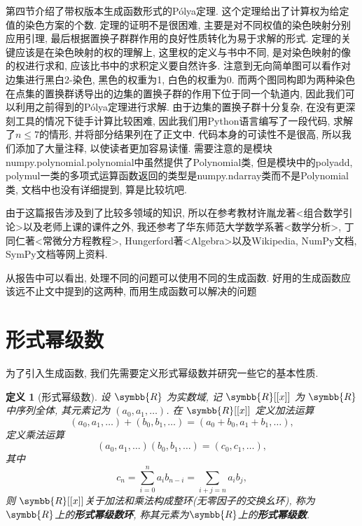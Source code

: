 \documentclass[chinese]{assignment}[2019/10/15]
\newcommand{\BR}{\symbb{R}}
\theoremstyle{plain}
\newtheorem{definition}[theorem]{定义}
\newcommand{\Polya}{P\'{o}lya}
\begin{document}
    第四节介绍了带权版本生成函数形式的\Polya 定理. 这个定理给出了计算权为给定值的染色方案的个数. 定理的证明不是很困难, 主要是对不同权值的染色映射分别应用引理, 最后根据置换子群群作用的良好性质转化为易于求解的形式. 定理的关键应该是在染色映射的权的理解上, 这里权的定义与书中不同, 是对染色映射的像的权进行求和, 应该比书中的求积定义要自然许多. 注意到无向简单图可以看作对边集进行黑白2-染色, 黑色的权重为1, 白色的权重为0. 而两个图同构即为两种染色在点集的置换群诱导出的边集的置换子群的作用下位于同一个轨道内, 因此我们可以利用之前得到的\Polya 定理进行求解. 由于边集的置换子群十分复杂, 在没有更深刻工具的情况下徒手计算比较困难, 因此我们用Python语言编写了一段代码, 求解了$n\leq 7$的情形, 并将部分结果列在了正文中. 代码本身的可读性不是很高, 所以我们添加了大量注释, 以使读者更加容易读懂. 需要注意的是模块numpy.polynomial.polynomial中虽然提供了Polynomial类, 但是模块中的polyadd, polymul一类的多项式运算函数返回的类型是numpy.ndarray类而不是Polynomial类, 文档中也没有详细提到, 算是比较坑吧.

    由于这篇报告涉及到了比较多领域的知识, 所以在参考教材许胤龙著<组合数学引论>以及老师上课的课件之外, 我还参考了华东师范大学数学系著<数学分析>, 丁同仁著<常微分方程教程>, Hungerford著<Algebra>以及Wikipedia, NumPy文档, SymPy文档等网上资料.

    从报告中可以看出, 处理不同的问题可以使用不同的生成函数. 好用的生成函数应该远不止文中提到的这两种, 而用生成函数可以解决的问题

    \section{形式幂级数}

    为了引入生成函数, 我们先需要定义形式幂级数并研究一些它的基本性质.

    \begin{definition}[形式幂级数]
        设 $\BR$ 为实数域, 记 $\BR[[x]]$ 为 $\BR$ 中序列全体, 其元素记为 $(a_0, a_1, \dotsc)$. 在 $\BR[[x]]$ 定义加法运算
        \begin{equation}
            (a_0, a_1, \dotsc) + (b_0, b_1, \dotsc) = (a_0+b_0, a_1+b_1, \dotsc),
        \end{equation}
        定义乘法运算
        \begin{equation}
            (a_0, a_1, \dotsc)(b_0, b_1, \dotsc) = (c_0, c_1, \dotsc),
        \end{equation}
        其中
        \begin{equation}
            c_n = \sum_{i=0}^na_ib_{n-i} = \sum_{i+j=n}a_ib_j,
        \end{equation}
        则 $\BR[[x]]$关于加法和乘法构成整环(无零因子的交换幺环), 称为$\BR$上的\textbf{形式幂级数环}, 称其元素为$\BR$上的\textbf{形式幂级数}.
    \end{definition}
\end{document}
